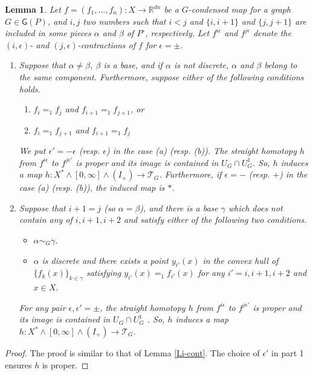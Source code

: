 \documentclass[reqno]{amsart}
\theoremstyle{definition}
\theoremstyle{plain}
\newtheorem{lem}[defi]{Lemma}
\newcommand{\eps}{\epsilon}
\newcommand{\TT}{\mathcal{T}} %
\newcommand{\GG}{\mathsf{G}}%
\newcommand{\RR}{\mathbb{R}}
\begin{document}
\begin{lem}\label{Li-cont_homotopy}
Let $f=(f_1,\dots, f_n):X\to \RR^{dn}$ be a $G$-condensed map for a graph $G\in \GG(P)$, and  $i, j$ two numbers such that $i<j$ and $\{i,i+1\}$ and $\{j,j+1\}$ are included in some pieces $\alpha$ and $\beta$ of $P^\circ$, respectively. Let $f^{i\eps}$ and $f^{j\eps}$ denote the $(i,\eps)$- and $(j,\eps)$-contractions of $f$ for $\eps=\pm$.
\begin{enumerate}
\item Suppose that $\alpha\not=\beta$, $\beta$ is a base,  and if $\alpha$ is not discrete, $\alpha$ and $\beta$ belong to the same component.  Furthermore, suppose  either of the following conditions holds.
\begin{enumerate}
\item $f_{i}=_1f_{j}$ and $f_{i+1}=_1f_{j+1}$, or 
\item $f_{i}=_1f_{j+1}$ and $f_{i+1}=_1f_{j} $ 
\end{enumerate}
We put $\eps'=-\eps$ (resp. $\eps$) in the case (a) (resp. (b)). The straight homotopy $h$ from  $f^{i\eps}$ to $f^{j\eps'}$  is proper and its image is contained in  $U_{G}\cap U^1_{G}$. So, $h$ induces a map $h:X^*\wedge[0,\infty]\wedge(I_+) \to \TT_{G}$. Furthermore, if $\eps=-$ (resp. $+$)  in the case (a) (resp. (b)), the induced map is $*$.

\item Suppose that $i+1=j$ (so $\alpha=\beta$), and there is a base $\gamma$ which does not contain any of $i,i+1,i+2$ and satisfy either of the following two conditions.
\begin{itemize}
\item  $\alpha\sim_G\gamma$.
\item  $\alpha$ is discrete and there exists a point $y_{i'}(x)$ in the convex hull of $\{f_k(x)\}_{k\in \gamma}$ satisfying $y_{i'}(x)=_1f_{i'}(x)$ for any $i'=i,i+1,i+2$ and $x\in X$.
\end{itemize}
For any pair $\eps, \eps'=\pm$, the straight homotopy $h$ from  $f^{i\eps}$ to $f^{j\eps'}$  is proper and its image is contained in $U_{G}\cap U^1_{G}$ . So, $h$ induces a map $h:X^*\wedge[0,\infty]\wedge(I_+) \to \TT_{G}$.
\end{enumerate}
\end{lem}
\begin{proof}
The proof is similar to that of Lemma \ref{Li-cont}. The choice of $\eps'$ in part 1 ensures $h$ is proper. 
\end{proof}
\end{document}
